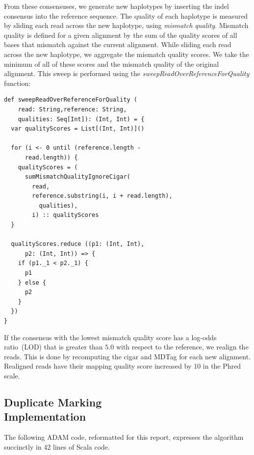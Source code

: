 \documentclass{acm_proc_article-sp}
\begin{document}
From these consensuses, we generate new haplotypes by inserting the indel consensus into the reference sequence. The quality of each haplotype is measured
by sliding each read across the new haplotype, using \emph{mismatch quality}. Mismatch quality is defined for a given alignment by the sum of the quality scores
of all bases that mismatch against the current alignment. While sliding each read across the new haplotype, we aggregate the mismatch quality scores. We take
the minimum of all of these scores and the mismatch quality of the original alignment. This sweep is performed using the \emph{sweepReadOverReferenceForQuality}
function:

\begin{lstlisting}
def sweepReadOverReferenceForQuality (
    read: String,reference: String,
    qualities: Seq[Int]): (Int, Int) = {
  var qualityScores = List[(Int, Int)]()

  for (i <- 0 until (reference.length -
      read.length)) {
    qualityScores = (
      sumMismatchQualityIgnoreCigar(
        read,
        reference.substring(i, i + read.length),
          qualities),
        i) :: qualityScores
  }

  qualityScores.reduce ((p1: (Int, Int),
      p2: (Int, Int)) => {
    if (p1._1 < p2._1) {
      p1
    } else {
      p2
    }
  })
}
\end{lstlisting}

If the consensus with the lowest mismatch quality score has a log-odds ratio~(LOD) that is greater than $5.0$ with respect to the reference, we realign the reads.
This is done by recomputing the cigar and MDTag for each new alignment. Realigned reads have their mapping quality score increased by 10 in the Phred scale.

\subsection{Duplicate Marking\\Implementation}
\label{sec:duplicate-marking-implementation}

The following ADAM code, reformatted for this report, expresses the algorithm succinctly in 42 lines of Scala code.
\end{document}
